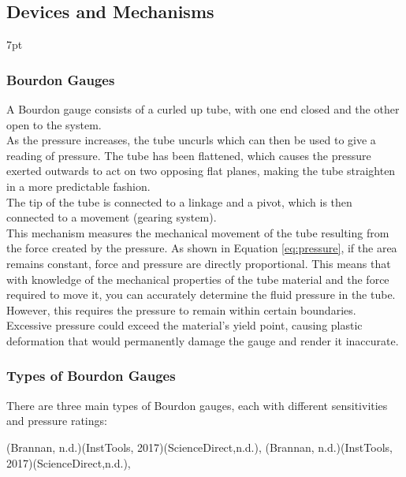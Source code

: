 \documentclass{article}
\newcommand{\formalsource}{} %
\newenvironment{formal}[3][]{%
	\renewcommand{\formalsource}{#1}%
	\def\FrameCommand{%
		\hspace{1pt}%
		{\color{#2}\vrule width 2pt}%
		{\color{#3}\vrule width 4pt}%
		\colorbox{#3}%
	}%
	\MakeFramed{\advance\hsize-\width\FrameRestore}%
	\noindent\hspace{-4.55pt}%
	\begin{adjustwidth}{}{7pt}%
		\vspace{2pt}%
	}%
	{%
		\vspace{4pt}%
		\ifx\formalsource\empty %
		\else
		\hfill{\footnotesize{\formalsource}}%
		\fi
	\end{adjustwidth}\endMakeFramed%
}
\begin{document}
\newpage
\subsection{Devices and Mechanisms}

\begin{formal}[(Brannan, n.d.)(InstTools, 2017)(ScienceDirect,n.d.), ]{black!50!white}{white}
\vspace{-1em}
\subsubsection{Bourdon Gauges}	
A Bourdon gauge consists of a curled up tube, with one end closed and the other open to the system.\\[8pt] 
As the pressure increases, the tube uncurls which can then be used to give a reading of pressure. The tube has been flattened, which causes the pressure exerted outwards to act on two opposing flat planes, making the tube straighten in a more predictable fashion.\\[8pt]
The tip of the tube is connected to a linkage and a pivot, which is then connected to a movement (gearing system).\\[8pt]
This mechanism measures the mechanical movement of the tube resulting from the force created by the pressure. As shown in Equation \ref{eq:pressure}, if the area remains constant, force and pressure are directly proportional. This means that with knowledge of the mechanical properties of the tube material and the force required to move it, you can accurately determine the fluid pressure in the tube.\\[8pt] 
However, this requires the pressure to remain within certain boundaries. Excessive pressure could exceed the material's yield point, causing plastic deformation that would permanently damage the gauge and render it inaccurate.\vspace{-0.5em}
\subsubsection*{Types of Bourdon Gauges}
There are three main types of Bourdon gauges, each with different sensitivities and pressure ratings:


\end{formal}
\end{document}
